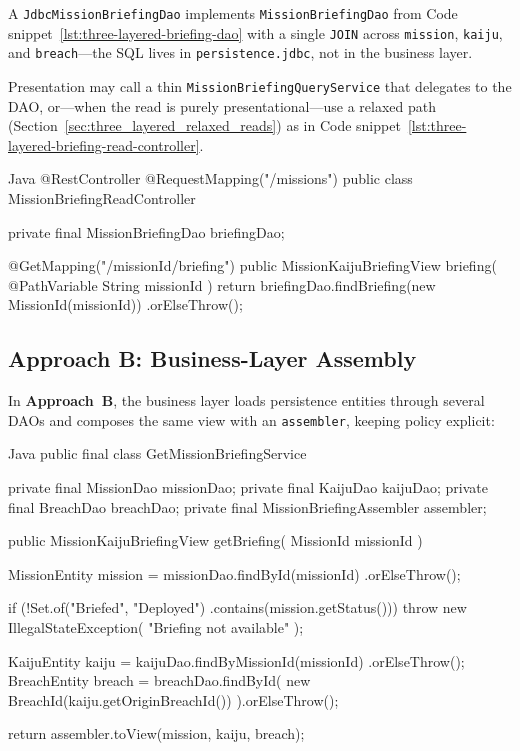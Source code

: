 A \texttt{JdbcMissionBriefingDao} implements \texttt{MissionBriefingDao} from Code snippet~\ref{lst:three-layered-briefing-dao} with a single \texttt{JOIN} across \texttt{mission}, \texttt{kaiju}, and \texttt{breach}---the SQL lives in \texttt{persistence.jdbc}, not in the business layer.

Presentation may call a thin \texttt{MissionBriefingQueryService} that delegates to the DAO, or---when the read is purely presentational---use a relaxed path (Section~\ref{sec:three_layered_relaxed_reads}) as in Code snippet~\ref{lst:three-layered-briefing-read-controller}.

\begin{ridercode}{Java}
@RestController
@RequestMapping("/missions")
public class MissionBriefingReadController
{
    private final MissionBriefingDao briefingDao;

    @GetMapping("/{missionId}/briefing")
    public MissionKaijuBriefingView briefing(
        @PathVariable String missionId
    )
    {
        return briefingDao.findBriefing(new MissionId(missionId))
            .orElseThrow();
    }
}
\end{ridercode}
\label{lst:three-layered-briefing-read-controller}

\subsection{Approach B: Business-Layer Assembly}
\label{sec:three_layered_view_assembly_service}

In \textbf{Approach~B}, the business layer loads persistence entities through several DAOs and composes the same view with an \texttt{assembler}, keeping policy explicit:

\begin{ridercode}{Java}
public final class GetMissionBriefingService
{
    private final MissionDao missionDao;
    private final KaijuDao kaijuDao;
    private final BreachDao breachDao;
    private final MissionBriefingAssembler assembler;

    public MissionKaijuBriefingView getBriefing(
        MissionId missionId
    )
    {
        MissionEntity mission = missionDao.findById(missionId)
            .orElseThrow();

        if (!Set.of("Briefed", "Deployed")
            .contains(mission.getStatus()))
        {
            throw new IllegalStateException(
                "Briefing not available"
            );
        }

        KaijuEntity kaiju = kaijuDao.findByMissionId(missionId)
            .orElseThrow();
        BreachEntity breach = breachDao.findById(
            new BreachId(kaiju.getOriginBreachId())
        ).orElseThrow();

        return assembler.toView(mission, kaiju, breach);
    }
}
\end{ridercode}
\label{lst:three-layered-get-briefing-service}

